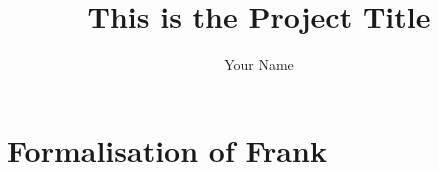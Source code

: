 \documentclass[msc,deptreport,cs]{infthesis} %
\begin{document}
\begin{preliminary}

\title{This is the Project Title}

\author{Your Name}


\maketitle



\end{preliminary}




\chapter{Formalisation of Frank}
\end{document}
